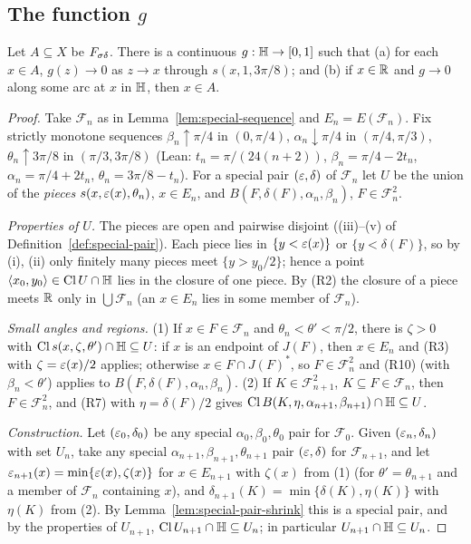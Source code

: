 \subsection{The function $g$}

\begin{theorem}\label{thm:construct-A}
Let $A\subseteq X$ be $F_{\sigma\delta}$. There is a continuous $g:\mathbb{H}\to[0,1]$ such that
(a) for each $x\in A$, $g(z)\to0$ as $z\to x$ through $s(x,1,3\pi/8)$; and
(b) if $x\in\mathbb{R}$ and $g\to0$ along some arc at $x$ in $\mathbb{H}$, then $x\in A$.
\end{theorem}
\begin{proof}
Take $\mathcal F_n$ as in Lemma~\ref{lem:special-sequence} and $E_n=E(\mathcal F_n)$. Fix strictly monotone sequences
$\beta_n\uparrow\pi/4$ in $(0,\pi/4)$, $\alpha_n\downarrow\pi/4$ in $(\pi/4,\pi/3)$, $\theta_n\uparrow3\pi/8$ in
$(\pi/3,3\pi/8)$ (Lean: $t_n=\pi/(24(n+2))$, $\beta_n=\pi/4-2t_n$, $\alpha_n=\pi/4+2t_n$, $\theta_n=3\pi/8-t_n$). For a
special pair $(\varepsilon,\delta)$ of $\mathcal F_n$ let $U$ be the union of the \emph{pieces} $s(x,\varepsilon(x),\theta_n)$,
$x\in E_n$, and $B(F,\delta(F),\alpha_n,\beta_n)$, $F\in\mathcal F^2_n$.

\emph{Properties of $U$.} The pieces are open and pairwise disjoint ((iii)--(v) of Definition~\ref{def:special-pair}).
Each piece lies in $\{y<\varepsilon(x)\}$ or $\{y<\delta(F)\}$, so by (i), (ii) only finitely many pieces meet $\{y>y_0/2\}$;
hence a point $\langle x_0,y_0\rangle\in\operatorname{Cl} U\cap\mathbb{H}$ lies in the closure of one piece. By (R2) the closure of a piece meets $\mathbb{R}$
only in $\bigcup\mathcal F_n$ (an $x\in E_n$ lies in some member of $\mathcal F_n$).

\emph{Small angles and regions.} (1) If $x\in F\in\mathcal F_n$ and $\theta_n<\theta'<\pi/2$, there is $\zeta>0$ with
$\operatorname{Cl} s(x,\zeta,\theta')\cap\mathbb{H}\subseteq U$: if $x$ is an endpoint of $J(F)$, then $x\in E_n$ and (R3) with $\zeta=\varepsilon(x)/2$
applies; otherwise $x\in F\cap J(F)^*$, so $F\in\mathcal F_n^2$ and (R10) (with $\beta_n<\theta'$) applies to
$B(F,\delta(F),\alpha_n,\beta_n)$. (2) If $K\in\mathcal F^2_{n+1}$, $K\subseteq F\in\mathcal F_n$, then $F\in\mathcal F^2_n$, and
(R7) with $\eta=\delta(F)/2$ gives $\operatorname{Cl} B(K,\eta,\alpha_{n+1},\beta_{n+1})\cap\mathbb{H}\subseteq U$.

\emph{Construction.} Let $(\varepsilon_0,\delta_0)$ be any special $\alpha_0,\beta_0,\theta_0$ pair for $\mathcal F_0$. Given
$(\varepsilon_n,\delta_n)$ with set $U_n$, take any special $\alpha_{n+1},\beta_{n+1},\theta_{n+1}$ pair $(\varepsilon,\delta)$ for
$\mathcal F_{n+1}$, and let $\varepsilon_{n+1}(x)=\min\{\varepsilon(x),\zeta(x)\}$ for $x\in E_{n+1}$ with $\zeta(x)$ from (1) (for $\theta'=\theta_{n+1}$
and a member of $\mathcal F_n$ containing $x$), and $\delta_{n+1}(K)=\min\{\delta(K),\eta(K)\}$ with $\eta(K)$ from (2). By
Lemma~\ref{lem:special-pair-shrink} this is a special pair, and by the properties of $U_{n+1}$,
$\operatorname{Cl} U_{n+1}\cap\mathbb{H}\subseteq U_n$; in particular $U_{n+1}\cap\mathbb{H}\subseteq U_n$.


\end{proof}
